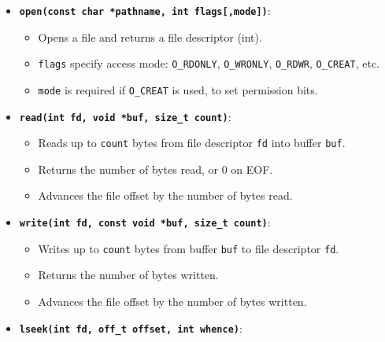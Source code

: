 \documentclass[8pt,twocolumn]{article}
\begin{document}
\begin{itemize}
  \setlength{\itemsep}{0pt} %
  \setlength{\parskip}{0pt}
  \item \textbf{\texttt{open(const char *pathname, int flags[,mode])}}:
\vspace{-0.6em}
    \begin{itemize}
      \setlength{\itemsep}{0pt} %
      \setlength{\parskip}{0pt}
      \item Opens a file and returns a file descriptor (int).
      \item \texttt{flags} specify access mode: \texttt{O\_RDONLY}, \texttt{O\_WRONLY}, \texttt{O\_RDWR}, \texttt{O\_CREAT}, etc.
      \item \texttt{mode} is required if \texttt{O\_CREAT} is used, to set permission bits.
    \end{itemize}
\vspace{-0.5em}
  \item \textbf{\texttt{read(int fd, void *buf, size\_t count)}}:
\vspace{-0.5em}
    \begin{itemize}
      \setlength{\itemsep}{0pt} %
      \setlength{\parskip}{0pt}
      \item Reads up to \texttt{count} bytes from file descriptor \texttt{fd} into buffer \texttt{buf}.
      \item Returns the number of bytes read, or 0 on EOF.
      \item Advances the file offset by the number of bytes read.
    \end{itemize}
\vspace{-0.5em}
  \item \textbf{\texttt{write(int fd, const void *buf, size\_t count)}}:
\vspace{-0.5em}
    \begin{itemize}
      \setlength{\itemsep}{0pt} %
      \setlength{\parskip}{0pt}
      \item Writes up to \texttt{count} bytes from buffer \texttt{buf} to file descriptor \texttt{fd}.
      \item Returns the number of bytes written.
      \item Advances the file offset by the number of bytes written.
    \end{itemize}
\vspace{-0.5em}
  \item \textbf{\texttt{lseek(int fd, off\_t offset, int whence)}}:

\end{itemize}
\end{document}
